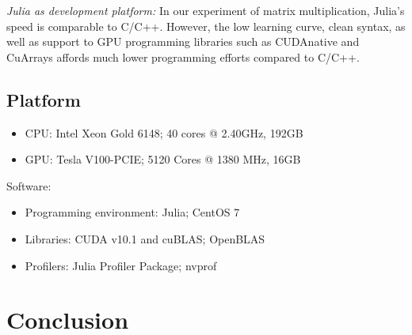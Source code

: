 \documentclass[9pt,twocolumn,twoside,lineno]{gsag3jnl}
\begin{document}
      {\em Julia as development platform:} In our experiment
of matrix multiplication, Julia's speed is comparable to C/C++.
However, the low learning curve, clean syntax, as well as
support to GPU programming libraries such as CUDAnative and
CuArrays affords much lower programming efforts compared to
C/C++.

\fi


\subsection{Platform}
 \begin{itemize}
	\item CPU: Intel Xeon Gold 6148; 40 cores @ 2.40GHz, 192GB 
	\item GPU: Tesla V100-PCIE; 5120 Cores @ 1380 MHz, 16GB
\end{itemize}
Software: 
\begin{itemize}
	\item Programming environment: Julia; CentOS 7
	\item Libraries: CUDA v10.1 and cuBLAS; OpenBLAS
	\item Profilers: Julia Profiler Package; nvprof
\end{itemize}



\section{Conclusion}



\end{document}
